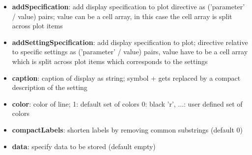 \documentclass[a4paper,fleqn]{tufte-handout}
\begin{document}
\begin{itemize}
\item \textbf{addSpecification}: add display specification to plot directive
    	as ('parameter' / value) pairs;
           value can be a cell array, in this case the cell array is split
           across plot items                 
\item \textbf{addSettingSpecification}:  add display specification to plot;
           directive relative to specific settings as ('parameter' / value) pairs,
           value have to be a cell array which is split
           across plot items which corresponds to the settings                
\item \textbf{caption}: caption of display as string;
    	symbol + gets replaced by a compact description of the setting  
\item \textbf{color}: color of line;
           1: default set of colors
           0: black
           {'r', ...}: user defined set of colors                 
\item \textbf{compactLabels}: shorten labels by removing common substrings
           (default 0)                 
\item \textbf{data}: specify data to be stored (default empty)  


\end{itemize}
\end{document}
